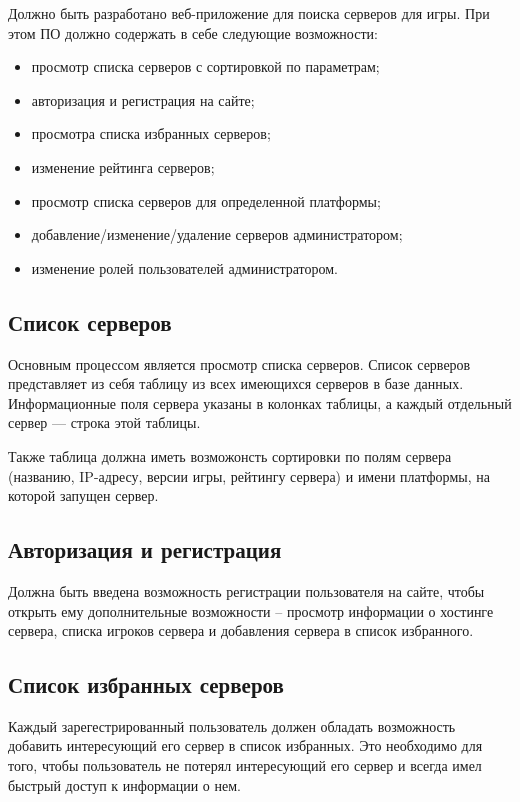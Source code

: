 Должно быть разработано веб-приложение для поиска серверов для игры. При этом ПО должно содержать в себе следующие возможности:

\begin{itemize}
    \item просмотр списка серверов с сортировкой по параметрам;
    \item авторизация и регистрация на сайте;
    \item просмотра списка избранных серверов;
    \item изменение рейтинга серверов;
    \item просмотр списка серверов для определенной платформы;
    \item добавление/изменение/удаление серверов администратором;
    \item изменение ролей пользователей администратором.
\end{itemize}

\subsection{Список серверов}

Основным процессом является просмотр списка серверов. Список серверов представляет из себя таблицу из всех имеющихся серверов в базе данных. Информационные поля сервера указаны в колонках таблицы, а каждый отдельный сервер --- строка этой таблицы.

Также таблица должна иметь возможонсть сортировки по полям сервера (названию, IP-адресу, версии игры, рейтингу сервера) и имени платформы, на которой запущен сервер.


\subsection{Авторизация и регистрация}

Должна быть введена возможность регистрации пользователя на сайте, чтобы открыть ему дополнительные возможности -- просмотр информации о хостинге сервера, списка игроков сервера и добавления сервера в список избранного.


\subsection{Список избранных серверов}

Каждый зарегестрированный пользователь должен обладать возможность добавить интересующий его сервер в список избранных. Это необходимо для того, чтобы пользователь не потерял интересующий его сервер и всегда имел быстрый доступ к информации о нем.


